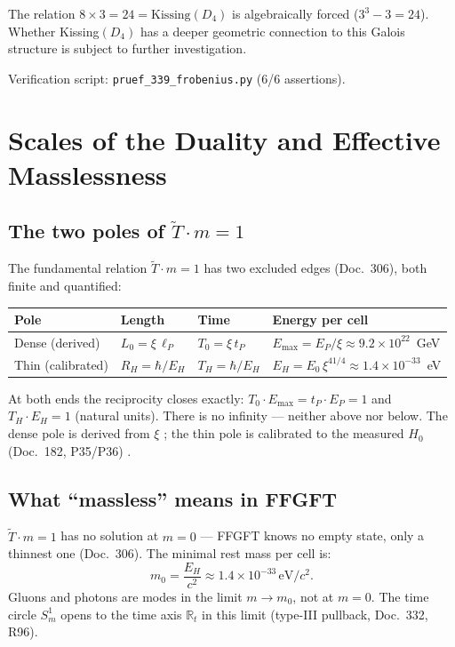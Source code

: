 The relation $8\times3=24=\mathrm{Kissing}(D_4)$ is algebraically forced
($3^3-3=24$). Whether Kissing$(D_4)$ has a deeper geometric connection to this
Galois structure is subject to further investigation.

Verification script: \texttt{pruef\_339\_frobenius.py} (6/6 assertions).

\section{Scales of the Duality and Effective Masslessness \KM}

\subsection{The two poles of $\tilde{T}\cdot m = 1$}

The fundamental relation $\tilde{T}\cdot m=1$ has two excluded edges
(Doc.~306), both finite and quantified:

\begin{center}
\renewcommand{\arraystretch}{1.3}
\begin{tabular}{llll}
\toprule
Pole & Length & Time & Energy per cell \\
\midrule
Dense (derived) & $L_0=\xi\,\ell_P$ & $T_0=\xi\,t_P$ & $E_\text{max}=E_P/\xi\approx9{.}2\times10^{22}$~GeV \\
Thin (calibrated) & $R_H=\hbar/E_H$ & $T_H=\hbar/E_H$ & $E_H=E_0\,\xi^{41/4}\approx1{.}4\times10^{-33}$~eV \\
\bottomrule
\end{tabular}
\end{center}

At both ends the reciprocity closes exactly:
$T_0\cdot E_\text{max}=t_P\cdot E_P=1$ and $T_H\cdot E_H=1$
(natural units). There is no infinity — neither above nor below.
The dense pole is derived from $\xi$ \BM; the thin pole is calibrated
to the measured $H_0$ (Doc.~182, P35/P36) \SM.

\subsection{What ``massless'' means in FFGFT}

$\tilde{T}\cdot m=1$ has no solution at $m=0$ — FFGFT knows no empty
state, only a thinnest one (Doc.~306). The minimal rest mass per cell is:
\[
m_0 = \frac{E_H}{c^2} \approx 1{.}4\times10^{-33}\,\text{eV}/c^2.
\]
Gluons and photons are modes in the limit $m\to m_0$, not at $m=0$.
The time circle $S^1_m$ opens to the time axis $\mathbb{R}_t$ in this
limit (type-III pullback, Doc.~332, R96).

